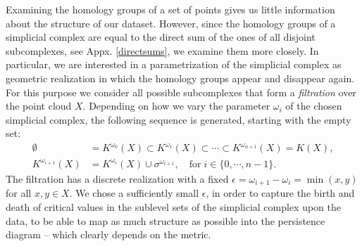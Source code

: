 \documentclass[envcountsect,runningheads]{llncs}
\begin{document}
Examining the homology groups of a set of points gives us little information about the structure of our dataset. However, since the homology groups of a simplicial complex are equal to the direct sum of the ones of all disjoint subcomplexes, see Appx. \ref{directsums}, we examine them more closely. In particular, we are interested in a parametrization of the simplicial complex as geometric realization in which the homology groups appear and disappear again. For this purpose we consider all possible subcomplexes that form a \emph{filtration} over the point cloud $X$. Depending on how we vary the parameter $\omega_i$ of the chosen simplicial complex, the following sequence is generated, starting with the empty set:
\begin{align}
	\emptyset &= K^{\omega_0}(X) \subset K^{\omega_1}(X) \subset \cdots \subset K^{\omega_{n+1}}(X) = K(X),\\
	K^{\omega_{i+1}}(X) &= K^{\omega_i}(X) \cup \sigma^{\omega_{i+1}}, \quad \text{for} \; i \in \{0, \cdots, n-1\}.
\end{align}
The filtration has a discrete realization with a fixed $\epsilon = \omega_{i+1}-\omega_{i} = \min(x,y)$ for all $x,y \in X$. We chose a sufficiently small $\epsilon$, in order to capture the birth and death of critical values in the sublevel sets of the simplicial complex upon the data, to be able to map as much structure as possible into the persistence diagram -- which clearly depends on the metric.

\end{document}
